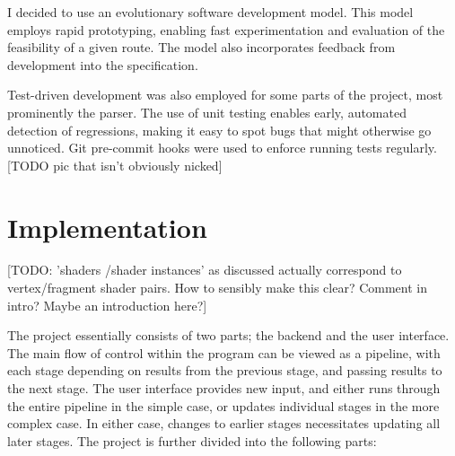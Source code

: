 \documentclass[12pt,twoside,notitlepage]{report}
\begin{document}
I decided to use an evolutionary software development model. This model employs rapid prototyping, enabling fast experimentation and evaluation of the feasibility of a given route. The model also incorporates feedback from development into the specification.

Test-driven development was also employed for some parts of the project, most prominently the parser. The use of unit testing enables early, automated detection of regressions, making it easy to spot bugs that might otherwise go unnoticed. Git pre-commit hooks were used to enforce running tests regularly. [TODO pic that isn't obviously nicked]


\cleardoublepage
\chapter{Implementation}
[TODO: 'shaders /shader instances' as discussed actually correspond to vertex/fragment shader pairs. How to sensibly make this clear? Comment in intro? Maybe an introduction here?]

The project essentially consists of two parts; the backend and the user interface. The main flow of control within the program can be viewed as a pipeline, with each stage depending on results from the previous stage, and passing results to the next stage. The user interface provides new input, and either runs through the entire pipeline in the simple case, or updates individual stages in the more complex case. In either case, changes to earlier stages necessitates updating all later stages. The project is further divided into the following parts:
\end{document}

